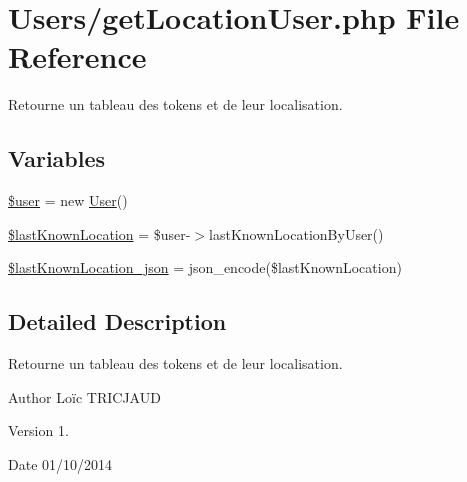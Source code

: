 \hypertarget{get_location_user_8php}{\section{Users/get\-Location\-User.php File Reference}
\label{get_location_user_8php}
}


Retourne un tableau des tokens et de leur localisation.  


\subsection*{Variables}
\begin{DoxyCompactItemize}
\item 
\hyperlink{get_location_user_8php_a598ca4e71b15a1313ec95f0df1027ca5}{\$user} = new \hyperlink{class_user}{User}()
\item 
\hyperlink{get_location_user_8php_aa5fe2c3d27419112c7d9ecfa23c5283d}{\$last\-Known\-Location} = \$user-\/$>$last\-Known\-Location\-By\-User()
\item 
\hyperlink{get_location_user_8php_a5fc838dd7506096f51e525a050c1672e}{\$last\-Known\-Location\-\_\-json} = json\-\_\-encode(\$last\-Known\-Location)
\end{DoxyCompactItemize}


\subsection{Detailed Description}
Retourne un tableau des tokens et de leur localisation. \begin{DoxyAuthor}{Author}
Loïc T\-R\-I\-C\-J\-A\-U\-D 
\end{DoxyAuthor}
\begin{DoxyVersion}{Version}
1. 
\end{DoxyVersion}
\begin{DoxyDate}{Date}
01/10/2014 
\end{DoxyDate}


